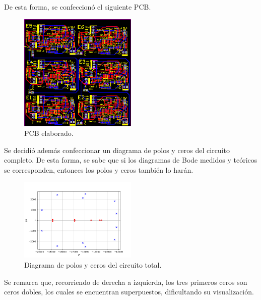 De esta forma, se confeccionó el siguiente PCB.
\begin{figure}[H]
\centering
	\includegraphics[width=0.5\textwidth]{Imagenes/PCB.png}
	\caption{PCB elaborado.}
\label{fig:pcb}
\end{figure}

Se decidió además confeccionar un diagrama de polos y ceros del circuito completo. De esta forma, se sabe que si los diagramas de Bode medidos y teóricos se corresponden, entonces los polos y ceros también lo harán.
\begin{figure}[H]
\centering
	\includegraphics[width=0.5\textwidth]{Imagenes/PolosyCeros.png}
	\caption{Diagrama de polos y ceros del circuito total.}
\label{fig:pyc}
\end{figure}

Se remarca que, recorriendo de derecha a izquierda, los tres primeros ceros son ceros dobles, los cuales se encuentran superpuestos, dificultando su visualización.

